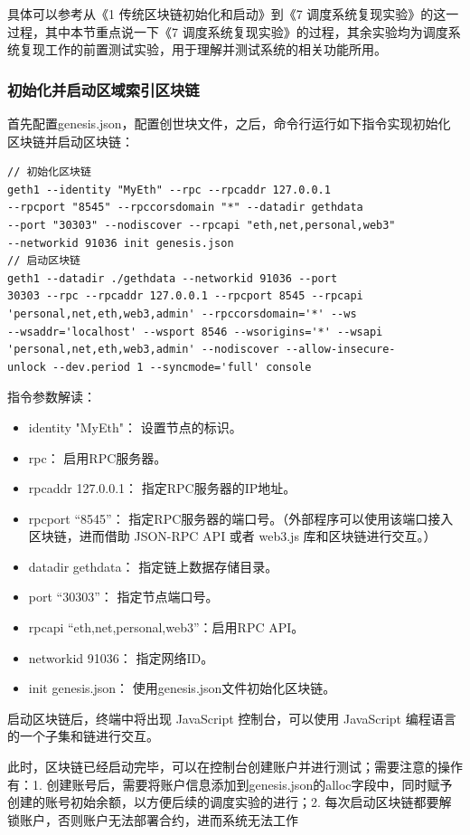 具体可以参考从《1 传统区块链初始化和启动》到《7 调度系统复现实验》的这一过程，其中本节重点说一下《7 调度系统复现实验》的过程，其余实验均为调度系统复现工作的前置测试实验，用于理解并测试系统的相关功能所用。

\subsubsection{初始化并启动区域索引区块链}

首先配置genesis.json，配置创世块文件，之后，命令行运行如下指令实现初始化区块链并启动区块链：

\begin{verbatim}
// 初始化区块链
geth1 --identity "MyEth" --rpc --rpcaddr 127.0.0.1  
--rpcport "8545" --rpccorsdomain "*" --datadir gethdata 
--port "30303" --nodiscover --rpcapi "eth,net,personal,web3"
--networkid 91036 init genesis.json
// 启动区块链
geth1 --datadir ./gethdata --networkid 91036 --port 
30303 --rpc --rpcaddr 127.0.0.1 --rpcport 8545 --rpcapi 
'personal,net,eth,web3,admin' --rpccorsdomain='*' --ws 
--wsaddr='localhost' --wsport 8546 --wsorigins='*' --wsapi 
'personal,net,eth,web3,admin' --nodiscover --allow-insecure-
unlock --dev.period 1 --syncmode='full' console
\end{verbatim}

指令参数解读：


\begin{itemize}
    \item identity "MyEth"：	设置节点的标识。
    \item rpc：					启用RPC服务器。
    \item rpcaddr 127.0.0.1：	指定RPC服务器的IP地址。
    \item rpcport “8545”：		指定RPC服务器的端口号。（外部程序可以使用该端口接入区块链，进而借助 JSON-RPC API 或者 web3.js 库和区块链进行交互。）
    \item datadir gethdata：	指定链上数据存储目录。
    \item port “30303”：		指定节点端口号。
    \item rpcapi “eth,net,personal,web3”：启用RPC API。
    \item networkid 91036：		指定网络ID。
    \item init genesis.json：	使用genesis.json文件初始化区块链。
\end{itemize}


启动区块链后，终端中将出现 JavaScript 控制台，可以使用 JavaScript 编程语言的一个子集和链进行交互。

此时，区块链已经启动完毕，可以在控制台创建账户并进行测试；需要注意的操作有：1. 创建账号后，需要将账户信息添加到genesis.json的alloc字段中，同时赋予创建的账号初始余额，以方便后续的调度实验的进行；2. 每次启动区块链都要解锁账户，否则账户无法部署合约，进而系统无法工作

